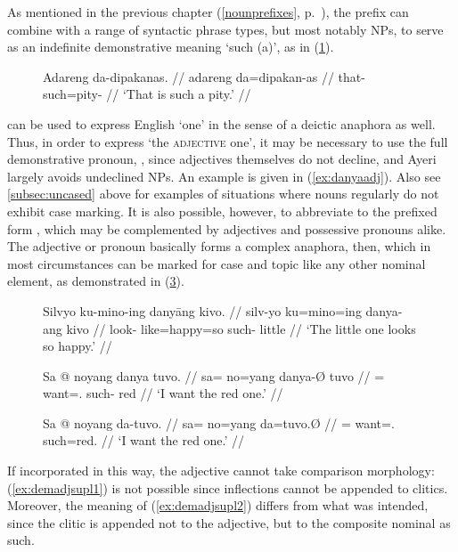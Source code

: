 As mentioned in the previous chapter (\autoref{nounprefixes},
p.~\pageref{nounprefixes}), the prefix  can combine
with a range of syntactic phrase types, but most notably NPs, to serve as an
indefinite demonstrative meaning `such (a)', as in (\ref{ex:danoun}).

\begin{figure}[h]
\ex\label{ex:danoun}%
\begingl
	\gla Adareng da-dipakanas. //
	\glb adareng da=dipakan-as //
	\glc that-\AargI{} such=pity-\Parg{} //
	\glft `That is such a pity.' //
\endgl
\xe
\end{figure}

 can be used to express English `one' in the sense of a deictic
anaphora as well. Thus, in order to express `the \textsc{adjective} one', it
may be necessary to use the full demonstrative pronoun, ,
since adjectives themselves do not decline, and Ayeri largely avoids undeclined
NPs. An example is given in (\ref{ex:danyaadj}). Also see
\autoref{subsec:uncased} above for examples of situations where nouns regularly
do not exhibit case marking. It is also possible, however, to abbreviate
 to the prefixed form , which may be
complemented by adjectives and possessive pronouns alike. The adjective or
pronoun basically forms a complex anaphora, then, which in most circumstances
can be marked for case and topic like any other nominal element, as
demonstrated in (\ref{ex:redone}).

\begin{figure}
\pex\label{ex:danyaadj}
\a\begingl
	\gla Silvyo ku-mino-ing danyāng kivo. //
	\glb silv-yo ku=mino=ing danya-ang kivo //
	\glc look-\TsgN{} like=happy=so such-\Aarg{} little //
	\glft `The little one looks so happy.' //
\endgl

\a\label{ex:danyatop}\begingl
	\gla Sa @ noyang danya tuvo. //
	\glb sa= no=yang danya-Ø tuvo //
	\glc \PatT{}= want=\Fsg{}.\Aarg{} such-\Top{} red //
	\glft `I want the red one.' //
\endgl
\xe
\end{figure}

\begin{figure}[h]
\ex\label{ex:redone}\begingl
	\gla Sa @ noyang da-tuvo. //
	\glb sa= no=yang da=tuvo.Ø //
	\glc \PatT{}= want=\Fsg{}.\Aarg{} such=red.\Top{} //
	\glft `I want the red one.' //
\endgl\xe
\end{figure}

If incorporated in this way, the adjective cannot take comparison morphology:
(\ref{ex:demadjsupl1}) is not possible since inflections cannot be appended to
clitics.
Moreover, the meaning of (\ref{ex:demadjsupl2}) differs from what was
intended, since the  clitic is appended not to the adjective,
but to the composite nominal as such.

